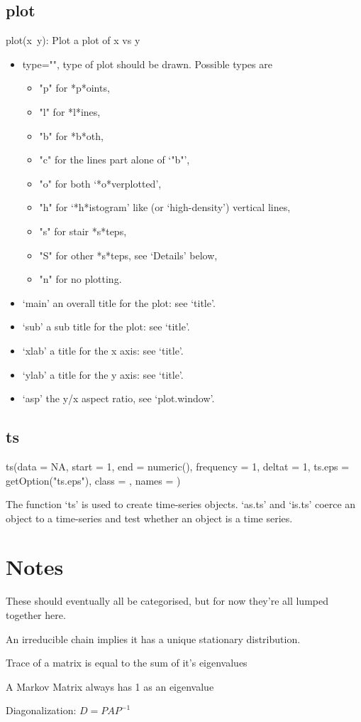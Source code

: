 \documentclass[12pt]{article}
\begin{document}
    \subsection{plot} plot(x~y): Plot a plot of x vs y
    \begin{itemize}
        \item type="", type of plot should be drawn.  Possible types are
            \begin{itemize}
                \item "p" for *p*oints,
                \item "l" for *l*ines,
                \item "b" for *b*oth,
                \item "c" for the lines part alone of ‘"b"’,
                \item "o" for both ‘*o*verplotted’,
                \item "h" for ‘*h*istogram’ like (or ‘high-density’) vertical lines,
                \item "s" for stair *s*teps,
                \item "S" for other *s*teps, see ‘Details’ below,
                \item "n" for no plotting.
            \end{itemize}
        \item ‘main’ an overall title for the plot: see ‘title’.
        \item ‘sub’ a sub title for the plot: see ‘title’.
        \item ‘xlab’ a title for the x axis: see ‘title’.
        \item ‘ylab’ a title for the y axis: see ‘title’.
        \item ‘asp’ the y/x aspect ratio, see ‘plot.window’.
    \end{itemize}

    \subsection{ts}
    ts(data = NA, start = 1, end = numeric(), frequency = 1, deltat = 1, ts.eps = getOption("ts.eps"), class = , names = )

    The function ‘ts’ is used to create time-series objects.
    ‘as.ts’ and ‘is.ts’ coerce an object to a time-series and test
    whether an object is a time series.

    \section{Notes}
    These should eventually all be categorised, but for now they're all lumped together here.

    An irreducible chain implies it has a unique stationary distribution.

    Trace of a matrix is equal to the sum of it's eigenvalues

    A Markov Matrix always has 1 as an eigenvalue

    Diagonalization: \(D = PAP^{-1}\)
    
\end{document}

